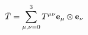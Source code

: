 \documentclass[preview]{standalone}
\begin{document}
\begin{align*}
\Bar{T} = \sum_{\mu,\nu=0}^3T^{\mu\nu}\textbf{e}_{\mu}\otimes \textbf{e}_{\nu}
\end{align*}
\end{document}
